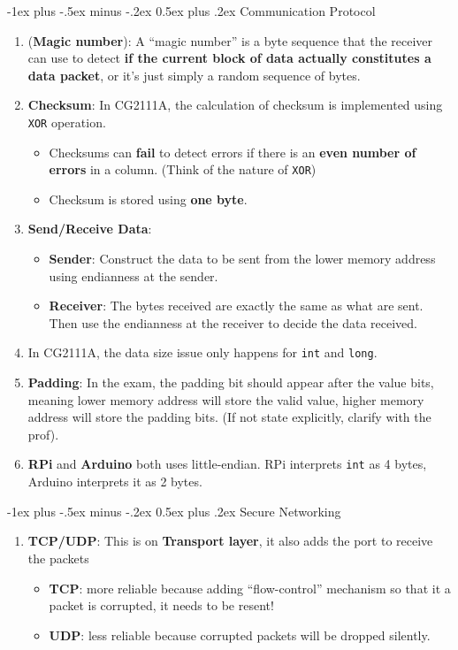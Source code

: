\documentclass[10pt, landscape]{article}
\makeatletter
\renewcommand{\section}{\@startsection{section}{1}{0mm}%
                                {-1ex plus -.5ex minus -.2ex}%
                                {0.5ex plus .2ex}%
                                {\normalfont\large\bfseries}}
\makeatother
\begin{document}
\begin{multicols}{4}
\section{Communication Protocol}
\begin{enumerate}
    \item (\textbf{Magic number}): A ``magic number'' is a byte sequence that the receiver can use to detect \textbf{if the current block of data actually constitutes a data packet}, or it’s just simply a random sequence of bytes.
    \item \textbf{Checksum}: In CG2111A, the calculation of checksum is implemented using \texttt{XOR} operation.
    \begin{itemize}
        \item Checksums can \textbf{fail} to detect errors if there is an \textbf{even number of errors} in a column. (Think of the nature of \texttt{XOR})
        \item Checksum is stored using \textbf{one byte}.
    \end{itemize}
    \item \textbf{Send/Receive Data}:
    \begin{itemize}
        \item \textbf{Sender}: Construct the data to be sent from the lower memory address using endianness at the sender.
        \item \textbf{Receiver}: The bytes received are exactly the same as what are sent. Then use the endianness at the receiver to decide the data received.
    \end{itemize}
    \item In CG2111A, the data size issue only happens for \texttt{int} and \texttt{long}.
    \item \textbf{Padding}: In the exam, the padding bit should appear after the value bits, meaning lower memory address will store the valid value, higher memory address will store the padding bits. (If not state explicitly, clarify with the prof).
    \item \textbf{RPi} and \textbf{Arduino} both uses little-endian. RPi interprets \texttt{int} as 4 bytes, Arduino interprets it as 2 bytes.
\end{enumerate}

\section{Secure Networking}
\begin{enumerate}
    \item \textbf{TCP/UDP}: This is on \textbf{Transport layer}, it also adds the port to receive the packets
    \begin{itemize}
        \item \textbf{TCP}: more reliable because adding ``flow-control'' mechanism so that it a packet is corrupted, it needs to be resent!
        \item \textbf{UDP}: less reliable because corrupted packets will be dropped silently.
    \end{itemize}
\end{enumerate}


\end{multicols}
\end{document}
